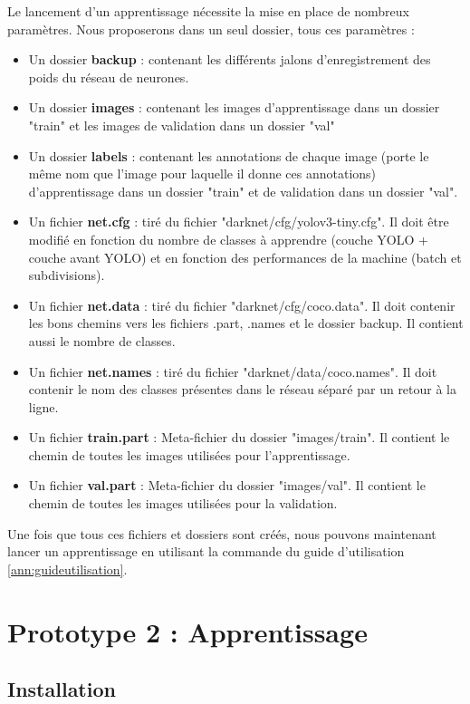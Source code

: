 \documentclass[debug,nodate,hideweeklyreports]{polytech/polytech}
\begin{document}
Le lancement d'un apprentissage nécessite la mise en place de nombreux paramètres.
Nous proposerons dans un seul dossier, tous ces paramètres :
\begin{itemize}
\item Un dossier \textbf{backup} : contenant les différents jalons d'enregistrement des poids du réseau de neurones.
\item Un dossier \textbf{images} : contenant les images d'apprentissage dans un dossier "train" et les images de validation dans un dossier "val"
\item Un dossier \textbf{labels} : contenant les annotations de chaque image (porte le même nom que l'image pour laquelle il donne ces annotations) d'apprentissage dans un dossier "train" et de validation dans un dossier "val".
\item Un fichier \textbf{net.cfg} : tiré du fichier "darknet/cfg/yolov3-tiny.cfg". Il doit être modifié en fonction du nombre de classes à apprendre (couche YOLO + couche avant YOLO) et en fonction des performances de la machine (batch et subdivisions).
\item Un fichier \textbf{net.data} : tiré du fichier "darknet/cfg/coco.data". Il doit contenir les bons chemins vers les fichiers .part, .names et le dossier backup. Il contient aussi le nombre de classes.
\item Un fichier \textbf{net.names} : tiré du fichier "darknet/data/coco.names". Il  doit contenir le nom des classes présentes dans le réseau séparé par un retour à la ligne.
\item Un fichier \textbf{train.part} : Meta-fichier du dossier "images/train". Il contient le chemin de toutes les images utilisées pour l'apprentissage.
\item Un fichier \textbf{val.part} : Meta-fichier du dossier "images/val". Il contient le chemin de toutes les images utilisées pour la validation.
\end{itemize}

Une fois que tous ces fichiers et dossiers sont créés, nous pouvons maintenant lancer un apprentissage en utilisant la commande du guide d'utilisation \autoref{ann:guideutilisation}.

\section{Prototype 2 : Apprentissage}

\subsection{Installation}
\end{document}
